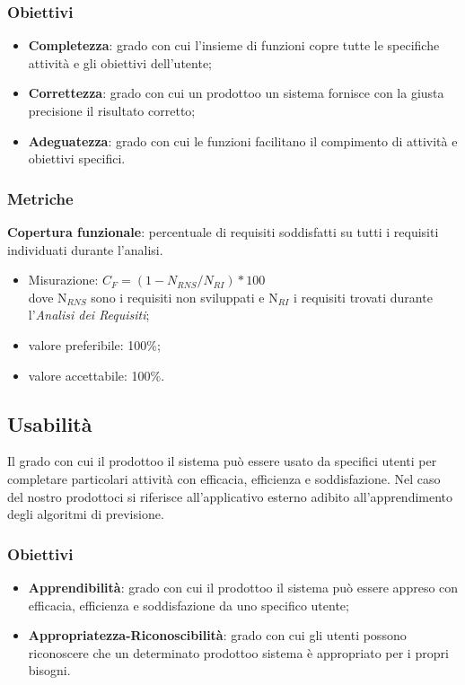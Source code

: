         \subsubsection{Obiettivi}
            \begin{itemize}
                \item \textbf{Completezza}: grado con cui l'insieme di funzioni copre tutte le specifiche attività e gli obiettivi dell'utente;
                \item \textbf{Correttezza}: grado con cui un prodotto\glosp o un sistema fornisce con la giusta precisione il risultato corretto;
                \item \textbf{Adeguatezza}: grado con cui le funzioni facilitano il compimento di attività e obiettivi specifici.
            \end{itemize}
        \subsubsection{Metriche}
            \textbf{Copertura funzionale}: percentuale di requisiti soddisfatti su tutti i requisiti individuati durante l'analisi.
                \begin{itemize}
                    \item Misurazione: $C_F=(1-N_{RNS}/N_{RI})*100$ \\
                    dove N$_{RNS}$ sono i requisiti non sviluppati e N$_{RI}$ i requisiti trovati durante l'\textit{Analisi dei Requisiti};
                    \item valore preferibile: 100\%;
                    \item valore accettabile: 100\%.
                \end{itemize}
    \subsection{Usabilità}
        Il grado con cui il prodotto\glosp o il sistema può essere usato da specifici utenti per completare particolari attività con efficacia, efficienza e soddisfazione. Nel caso del nostro prodotto\glosp ci si riferisce all'applicativo esterno adibito all'apprendimento degli algoritmi di previsione.
        \subsubsection{Obiettivi}
            \begin{itemize}
                \item \textbf{Apprendibilità}: grado con cui il prodotto\glosp o il sistema può essere appreso con efficacia, efficienza e soddisfazione da uno specifico utente;
                \item \textbf{Appropriatezza-Riconoscibilità}: grado con cui gli utenti possono riconoscere che un determinato prodotto\glosp o sistema è appropriato per i propri bisogni.
            \end{itemize}
